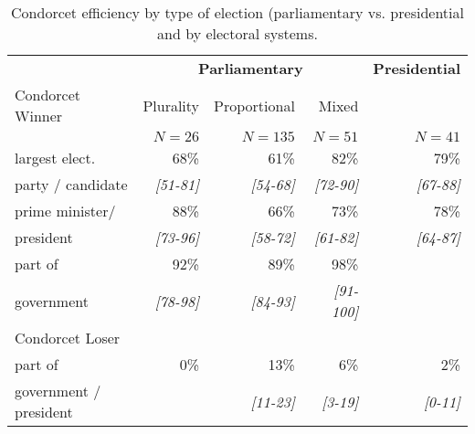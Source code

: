 \begin{table}[ht]
\caption{Condorcet efficiency by type of election (parliamentary vs. presidential and by electoral systems.}
\centering
\begin{tabular}{l|rrr|r} \toprule 
   & \multicolumn{3}{c|}{\textbf{Parliamentary}} & \textbf{Presidential}\\
 Condorcet Winner& Plurality  & Proportional & Mixed &  \\
                &   $N=26$   & $N=135$   & $N=51$    & $N=41$ \\ \midrule 
largest elect. & 68\%     & 61\%   &   82\% &  79\%  \\
party / candidate & \emph{[51-81]} & \emph{[54-68]} & \emph{[72-90]} & \emph{[67-88]} \\ \midrule 
prime minister/ &   88\% &  66\% &   73\% &   78\% \\
president & \emph{[73-96]} & \emph{[58-72]} & \emph{[61-82]} & \emph{[64-87]} \\ \midrule
part of &   92\% &  89\% &   98\% &    \\
government & \emph{[78-98]} & \emph{[84-93]} & \emph{[91-100]} & \\ \midrule
Condorcet Loser & & & & \\
part of & 0\%& 13\%& 6\% & 2\%\\
government / president &  & \emph{[11-23]} & \emph{[3-19]} & \emph{[0-11]} \\
\bottomrule 
\end{tabular}
\label{tb.efficiency}
\end{table}